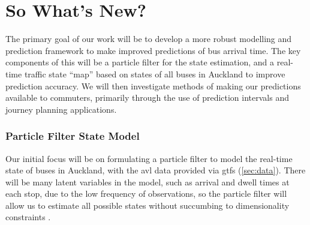 \documentclass[12pt,a4paper]{article}
\begin{document}





\section{So What's New?}
\label{sec:whatsnew}

The primary goal of our work will be to develop a more robust modelling
and prediction framework to make improved predictions of bus arrival time.
The key components of this will be a particle filter for the state estimation,
and a real-time traffic state ``map'' based on states of all buses in Auckland
to improve prediction accuracy.
We will then investigate methods of making our predictions available to commuters,
primarily through the use of prediction intervals and journey planning applications.


\subsubsection*{Particle Filter State Model}

Our initial focus will be on formulating a particle filter to model the real-time state
of buses in Auckland,
with the \gls{avl} data provided via \gls{gtfs} (\cref{sec:data}).
There will be many latent variables in the model,
such as arrival and dwell times at each stop,
due to the low frequency of observations,
so the particle filter will allow us to estimate all possible states without
succumbing to dimensionality constraints
\citep{hofleitner-etal:2012}.
\end{document}
